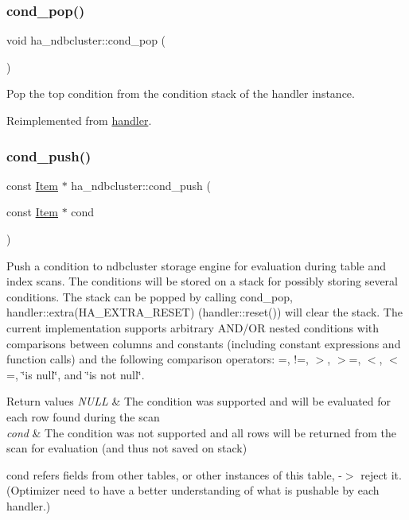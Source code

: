 \subsubsection{\texorpdfstring{cond\+\_\+pop()}{cond\_pop()}}
{\footnotesize\ttfamily void ha\+\_\+ndbcluster\+::cond\+\_\+pop (\begin{DoxyParamCaption}{ }\end{DoxyParamCaption})\hspace{0.3cm}{\ttfamily [virtual]}}

Pop the top condition from the condition stack of the handler instance. 

Reimplemented from \mbox{\hyperlink{classhandler_ac3eb8d2966b848ec4beea5a25cba9dea}{handler}}.

\mbox{\label{classha__ndbcluster_a2285b3af9153f052ef6ba0cfc3bacea1}} 
\subsubsection{\texorpdfstring{cond\+\_\+push()}{cond\_push()}}
{\footnotesize\ttfamily const \mbox{\hyperlink{classItem}{Item}} $\ast$ ha\+\_\+ndbcluster\+::cond\+\_\+push (\begin{DoxyParamCaption}\item[{const \mbox{\hyperlink{classItem}{Item}} $\ast$}]{cond }\end{DoxyParamCaption})\hspace{0.3cm}{\ttfamily [virtual]}}

Push a condition to ndbcluster storage engine for evaluation during table and index scans. The conditions will be stored on a stack for possibly storing several conditions. The stack can be popped by calling cond\+\_\+pop, handler\+::extra(\+H\+A\+\_\+\+E\+X\+T\+R\+A\+\_\+\+R\+E\+S\+E\+T) (handler\+::reset()) will clear the stack. The current implementation supports arbitrary A\+N\+D/\+OR nested conditions with comparisons between columns and constants (including constant expressions and function calls) and the following comparison operators\+: =, !=, $>$, $>$=, $<$, $<$=, \char`\"{}is null\char`\"{}, and \char`\"{}is not null\char`\"{}.


\begin{DoxyRetVals}{Return values}
{\em N\+U\+LL} & The condition was supported and will be evaluated for each row found during the scan \\
\hline
{\em cond} & The condition was not supported and all rows will be returned from the scan for evaluation (and thus not saved on stack) \\
\hline
\end{DoxyRetVals}
\textquotesingle{}cond\textquotesingle{} refers fields from other tables, or other instances of this table, -\/$>$ reject it. (Optimizer need to have a better understanding of what is pushable by each handler.)

